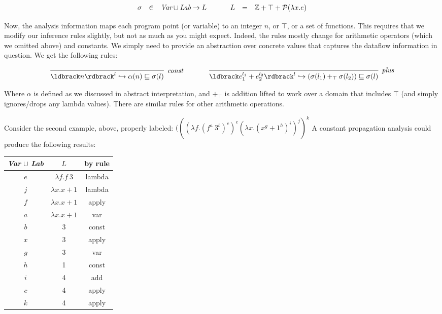 \documentclass[11pt]{article}
\begin{document}

\[
\begin{array}{lllllll}
\sigma & \in & \textit{Var} \cup \textit{Lab} \rightarrow L & ~~~~ & L & = & \mathbb{Z} + \top + \mathcal{P}(\lambda x . e)
\end{array}
\]

Now, the analysis information maps each program point (or variable) to an
integer $n$, or $\top$, or a set of functions. This requires that we modify our
inference rules slightly, but not as much as you might expect. Indeed, the rules
mostly change for arithmetic operators (which we omitted above) and constants.
We simply need to provide an abstraction over concrete values that captures the
dataflow information in question. We get the following rules:


\[
\begin{array}{ccc}
\infer[\textit{const}]
	{\parg{n}^l \hookrightarrow \alpha(n) \alap \sigma(l)}
	{}
& ~~~~~ &
\infer[\textit{plus}]
	{\parg{e_1^{l_1}+e_2^{l_2}}^l \hookrightarrow (\sigma(l_1) +_\top \sigma(l_2)) \alap \sigma(l)}
	{}
    
\end{array}
	\]
	
\noindent Where $\alpha$ is defined as we discussed in abstract interpretation, and $+_\top$ is addition lifted to work over a domain that includes $\top$ (and simply ignores/drops any lambda values).  There are similar rules for other arithmetic operations.

Consider the second example, above, properly labeled: $(((\lambda f . (f^a ~ 3^b)^c)^e (\lambda x . (x^g + 1^h)^i)^j)^k$ A constant propagation analysis could produce the following results:


\tablespace
\begin{tabular}{c | c | c}
\textit{Var} $\cup$ \textit{Lab} & $L$ & by rule \\
\hline
$e$ & $\lambda f . f ~ 3$ & lambda \\
$j$ & $\lambda x . x + 1$ & lambda \\
$f$ & $\lambda x . x + 1$ & apply \\
$a$ & $\lambda x . x + 1$ & var \\
$b$ & 3 & const \\
$x$ & 3 & apply \\
$g$ & 3 & var \\
$h$ & 1 & const \\
$i$ & 4 & add \\
$c$ & 4 & apply \\
$k$ & 4 & apply \\

\end{tabular}
\tablespace
\end{document}
